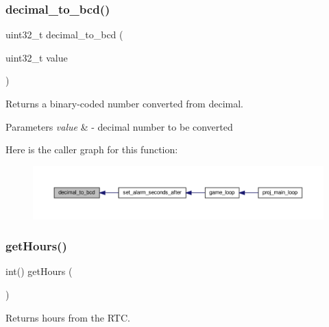\subsubsection{\texorpdfstring{decimal\+\_\+to\+\_\+bcd()}{decimal\_to\_bcd()}}
{\footnotesize\ttfamily uint32\+\_\+t decimal\+\_\+to\+\_\+bcd (\begin{DoxyParamCaption}\item[{uint32\+\_\+t}]{value }\end{DoxyParamCaption})}



Returns a binary-\/coded number converted from decimal. 


\begin{DoxyParams}{Parameters}
{\em value} & -\/ decimal number to be converted \\
\hline
\end{DoxyParams}
Here is the caller graph for this function\+:
\nopagebreak
\begin{figure}[H]
\begin{center}
\leavevmode
\includegraphics[width=350pt]{group__rtc_ga2e0029ef8fd7e11a5189b0bc4634a2c7_icgraph}
\end{center}
\end{figure}
\mbox{\label{group__rtc_ga51db428cbafeba59111359b236ed248a}} 
\subsubsection{\texorpdfstring{get\+Hours()}{getHours()}}
{\footnotesize\ttfamily int() get\+Hours (\begin{DoxyParamCaption}{ }\end{DoxyParamCaption})}



Returns hours from the R\+TC. 

